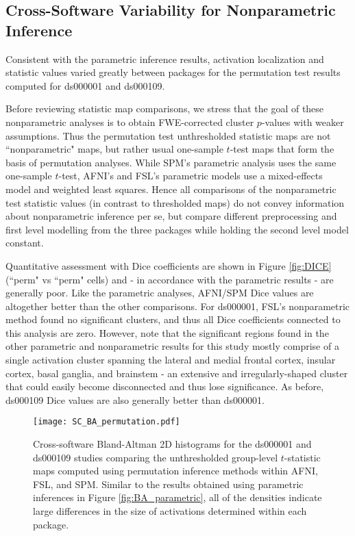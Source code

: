 \subsection{Cross-Software Variability for Nonparametric Inference}

Consistent with the parametric inference results, activation localization and statistic values varied greatly between packages for the permutation test results computed for ds000001 and ds000109.

Before reviewing statistic map comparisons, we stress that the goal of these nonparametric analyses is to obtain FWE-corrected cluster $p$-values with weaker assumptions. Thus the permutation test unthresholded statistic maps are not ``nonparametric" maps, but rather usual one-sample $t$-test maps that form the basis of permutation analyses. While SPM's parametric analysis uses the same one-sample $t$-test, AFNI's and FSL's parametric models use a mixed-effects model and weighted least squares. Hence all comparisons of the nonparametric test statistic values (in contrast to thresholded maps) do not convey information about nonparametric inference per se, but compare different preprocessing and first level modelling from the three packages while holding the second level model constant.

Quantitative assessment with Dice coefficients are shown in Figure \ref{fig:DICE} (``perm" vs ``perm" cells) and - in accordance with the parametric results - are generally poor. Like the parametric analyses, AFNI/SPM Dice values are altogether better than the other comparisons. For ds000001, FSL's nonparametric method found no significant clusters, and thus all Dice coefficients connected to this analysis are zero. However, note that the significant regions found in the other parametric and nonparametric results for this study mostly comprise of a single activation cluster spanning the lateral and medial frontal cortex, insular cortex, basal ganglia, and brainstem - an extensive and irregularly-shaped cluster that could easily become disconnected and thus lose significance. As before, ds000109 Dice values are also generally better than ds000001.

\begin{figure}[htbp]
\centering
	\texttt{[image: SC\_BA\_permutation.pdf]}	
\caption{Cross-software Bland-Altman 2D histograms for the ds000001 and ds000109 studies comparing the unthresholded group-level $t$-statistic maps computed using permutation inference methods within AFNI, FSL, and SPM. Similar to the results obtained using parametric inferences in Figure \ref{fig:BA_parametric}, all of the densities indicate large differences in the size of activations determined within each package.}
\label{fig:BA_permutation}
\end{figure}

